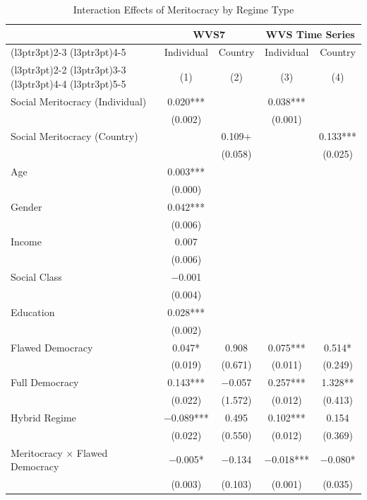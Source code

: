 \begin{table}[!h]
\centering\centering
\caption{Interaction Effects of Meritocracy by Regime Type}
\centering
\begin{threeparttable}
\fontsize{10}{12}\selectfont
\begin{tabular}[t]{lcccc}
\toprule
\multicolumn{1}{c}{ } & \multicolumn{2}{c}{WVS7} & \multicolumn{2}{c}{WVS Time Series} \\
\cmidrule(l{3pt}r{3pt}){2-3} \cmidrule(l{3pt}r{3pt}){4-5}
\multicolumn{1}{c}{ } & \multicolumn{1}{c}{Individual} & \multicolumn{1}{c}{Country} & \multicolumn{1}{c}{Individual } & \multicolumn{1}{c}{Country } \\
\cmidrule(l{3pt}r{3pt}){2-2} \cmidrule(l{3pt}r{3pt}){3-3} \cmidrule(l{3pt}r{3pt}){4-4} \cmidrule(l{3pt}r{3pt}){5-5}
  &  (1) &   (2) &   (3) &   (4)\\
\midrule
Social Meritocracy (Individual) & 0.020*** &  & 0.038*** & \\
 & (0.002) &  & (0.001) & \\
Social Meritocracy (Country) &  & 0.109+ &  & 0.133***\\
 &  & (0.058) &  & (0.025)\\
Age & 0.003*** &  &  & \\
 & (0.000) &  &  & \\
Gender & 0.042*** &  &  & \\
 & (0.006) &  &  \vphantom{1} & \\
Income & 0.007 &  &  & \\
 & (0.006) &  &  & \\
Social Class & −0.001 &  &  & \\
 & (0.004) &  &  & \\
Education & 0.028*** &  &  & \\
 & (0.002) &  &  & \\
Flawed Democracy & 0.047* & 0.908 & 0.075*** & 0.514*\\
 & (0.019) & (0.671) & (0.011) & (0.249)\\
Full Democracy & 0.143*** & −0.057 & 0.257*** & 1.328**\\
 & (0.022) & (1.572) & (0.012) & (0.413)\\
Hybrid Regime & −0.089*** & 0.495 & 0.102*** & 0.154\\
 & (0.022) & (0.550) & (0.012) & (0.369)\\
Meritocracy $\times$ Flawed Democracy & −0.005* & −0.134 & −0.018*** & −0.080*\\
 & (0.003) & (0.103) & (0.001) & (0.035)\\

\end{tabular}
\end{threeparttable}
\end{table}
